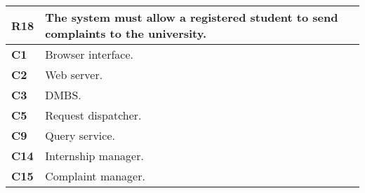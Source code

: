 \begin{table}[H]
    \centering
    \begin{tabular}{|l|m{10cm}|}
        \hline \textbf{R18} & The system must allow a registered student to send complaints to the university.\\
        \hline \textbf{C1} & Browser interface. \\
        \hline \textbf{C2} & Web server. \\
        \hline \textbf{C3} & DMBS. \\
        \hline \textbf{C5} & Request dispatcher. \\
        \hline \textbf{C9} & Query service. \\
        \hline \textbf{C14} & Internship manager. \\
        \hline \textbf{C15} & Complaint manager. \\
        \hline
    \end{tabular}
\end{table}

